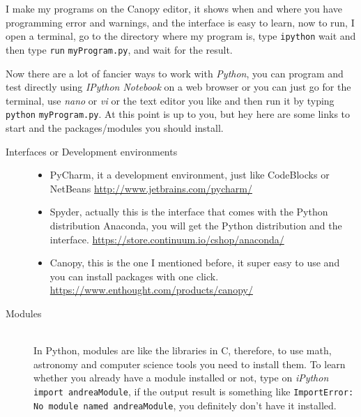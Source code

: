 \documentclass[11pt,fleqn]{book} %
\begin{document}
\begin{description}
    I make my programs on the Canopy editor, it shows when and where you have programming error and warnings, and the interface is easy to learn, now to run, I open a terminal, go to the directory where my program is, type \verb|ipython| wait and then type \verb|run| \verb|myProgram.py|, and wait for the result.
    
    Now there are a lot of fancier ways to work with \emph{Python}, you can program and test directly using \emph{IPython Notebook} on a web browser or you can just go for the terminal, use \emph{nano} or \emph{vi} or the text editor you like and then run it by typing \verb|python| \verb|myProgram.py|. At this point is up to you, but hey here are some links to start and the packages/modules you should install.
    
    \begin{description}
    	\item[Interfaces or Development environments]\hfill
        	\begin{itemize}
            	\item PyCharm, it a development environment, just like CodeBlocks or NetBeans \url{http://www.jetbrains.com/pycharm/}
                \item Spyder, actually this is the interface that comes with the Python distribution Anaconda, you will get the Python distribution and the interface. \url{https://store.continuum.io/cshop/anaconda/}
                \item Canopy, this is the one I mentioned before, it super easy to use and you can install packages with one click. \url{https://www.enthought.com/products/canopy/}
            \end{itemize}
        \item[Modules]\hfill
        \\
        In Python, modules are like the libraries in C, therefore, to use math, astronomy and computer science tools you need to install them. To learn whether you already have a module installed or not, type on \emph{iPython} \verb|import andreaModule|, if the output result is something like \verb|ImportError: No module named andreaModule|, you definitely don't have it installed. 
        

\end{description}
\end{description}
\end{document}
